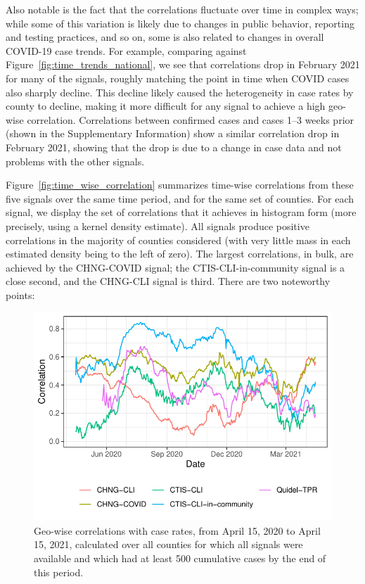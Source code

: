 \documentclass[9pt,twocolumn,twoside,lineno]{pnas-new}
\begin{document}
Also notable is the fact that the correlations fluctuate over time in complex
ways; while some of this variation is likely due to changes in public behavior,
reporting and testing practices, and so on, some is also related to changes in
overall COVID-19 case trends. For example, comparing against
Figure~\ref{fig:time_trends_national}, we see that correlations drop in February
2021 for many of the signals, roughly matching the point in time when COVID
cases also sharply decline. This decline likely caused the heterogeneity in case
rates by county to decline, making it more difficult for any signal to achieve a
high geo-wise correlation. Correlations between confirmed cases and cases 1--3
weeks prior (shown in the Supplementary Information) show a similar correlation
drop in February 2021, showing that the drop is due to a change in case data and
not problems with the other signals.

Figure~\ref{fig:time_wise_correlation} summarizes time-wise correlations from
these five signals over the same time period, and for the same set of counties.
For each signal, we display the set of correlations that it achieves in
histogram form (more precisely, using a kernel density estimate). All signals
produce positive correlations in the majority of counties considered (with very
little mass in each estimated density being to the left of zero). The largest
correlations, in bulk, are achieved by the CHNG-COVID signal; the
CTIS-CLI-in-community signal is a close second, and the CHNG-CLI signal is
third. There are two noteworthy points:

\begin{figure}[t]
  \includegraphics[width=\columnwidth]{fig/geo_wise_corr.pdf}
  \caption{Geo-wise correlations with case rates, from April 15, 2020 to April
    15, 2021, calculated over all counties for which all signals were available
    and which had at least 500 cumulative cases by the end of this period.}
  \label{fig:geo_wise_correlation}
\end{figure}
\end{document}
